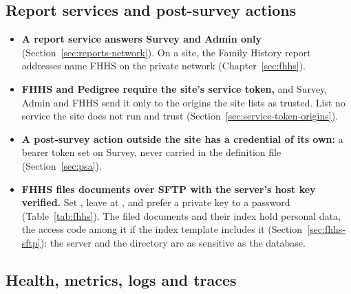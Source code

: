 \documentclass[11pt, a4paper]{article}
\begin{document}
\subsection{Report services and post-survey actions}
\label{sec:security-reports}

\begin{itemize}
  \item \textbf{A report service answers Survey and Admin only}
        (Section~\ref{sec:reports-network}). On a site, the Family History report addresses
        name FHHS on the private network (Chapter~\ref{sec:fhhs}).
  \item \textbf{FHHS and Pedigree require the site's service token,} and Survey, Admin and
        FHHS send it only to the origins the site lists as trusted. List no service the site
        does not run and trust (Section~\ref{sec:service-token-origins}).
  \item \textbf{A post-survey action outside the site has a credential of its own:} a bearer
        token set on Survey, never carried in the definition file (Section~\ref{sec:psa}).
  \item \textbf{FHHS files documents over SFTP with the server's host key verified.} Set
        , leave
         at , and prefer a private key
        to a password (Table~\ref{tab:fhhs}). The filed documents and their index hold
        personal data, the access code among it if the index template includes it
        (Section~\ref{sec:fhhs-sftp}): the server and the directory are as sensitive as the
        database.
\end{itemize}

\subsection{Health, metrics, logs and traces}
\label{sec:security-observability}
\end{document}

